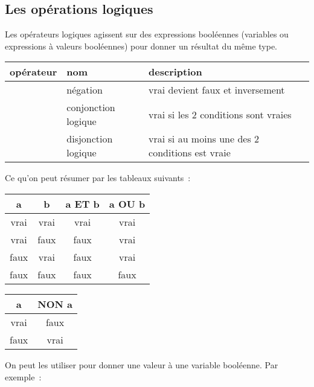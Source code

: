 		\subsection{Les opérations logiques}
	
			Les opérateurs logiques agissent sur des expressions booléennes 
			(variables ou expressions à valeurs booléennes) 
			pour donner un résultat du même type.
	
			\begin{center}
			\begin{tabular}{m{15mm}|m{3cm}|m{8cm}}
			opérateur & nom & description \\
			\hline
			\raggedleft \lda{NON} & négation & vrai devient faux et inversement\\
			\raggedleft \lda{ET} & conjonction logique & vrai si les 2 conditions sont vraies\\
			\raggedleft \lda{OU} & disjonction logique & vrai si au moins une des 2 conditions est vraie\\
			\hline
			\end{tabular}
			\end{center}
			\medskip
			
			Ce qu’on peut résumer par les tableaux suivants~:
			
			\begin{center}
			\begin{tabular}{|cccc|}
				\hline
				a & b & a ET b & a OU b \\
				\hline
				vrai & vrai & vrai & vrai \\\hline
				vrai & faux & faux & vrai \\\hline
				faux & vrai & faux & vrai \\\hline
				faux & faux & faux & faux \\\hline				
			\end{tabular}
			\qquad
			\begin{tabular}{|cc|}
				\hline
				a & NON a \\
				\hline
				vrai & faux \\\hline
				faux & vrai \\\hline
			\end{tabular}
			\end{center}

			On peut les utiliser 
			pour donner une valeur à une variable booléenne.
			Par exemple~:
			
